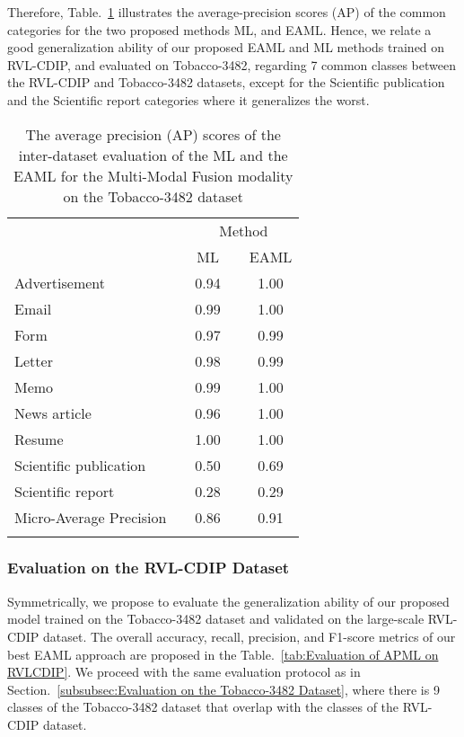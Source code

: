 \documentclass[twocolumn]{svjour3}
\begin{document}
Therefore, Table.~\ref{tab:AP scores} illustrates the average-precision scores (AP) of the common categories for the two proposed methods ML, and EAML. Hence, we relate a good generalization ability of our proposed EAML and ML methods trained on RVL-CDIP, and evaluated on Tobacco-3482, regarding 7 common classes between the RVL-CDIP and Tobacco-3482 datasets, except for the Scientific publication and the Scientific report categories where it generalizes the worst. 
\setlength\tabcolsep{0.6 pt}
\begin{table}[tbh]
\small
\centering
\caption{The average precision (AP) scores of the inter-dataset evaluation of the ML and the EAML for the Multi-Modal Fusion modality on the Tobacco-3482 dataset}
    \begin{tabular}{lcccc}
    \hline\noalign{\smallskip}
    \multicolumn{1}{c}{} && \multicolumn{3}{c}{Method} \\
         \noalign{\smallskip}\hline\noalign{\smallskip}
     \multicolumn{1}{c}{Class Labels} && \multicolumn{1}{c}{ML} && \multicolumn{1}{c}{EAML} \\
         \noalign{\smallskip}\hline\noalign{\smallskip}
         Advertisement && 0.94 && 1.00\\
         Email && 0.99 && 1.00\\
         Form && 0.97 && 0.99\\
         Letter && 0.98 && 0.99\\
         Memo && 0.99 && 1.00\\
         News article && 0.96 && 1.00\\
         Resume && 1.00 && 1.00\\
         Scientific publication && 0.50 && 0.69\\
         Scientific report && 0.28 && 0.29\\
    \noalign{\smallskip}\hline\noalign{\smallskip}
        Micro-Average Precision && 0.86 && 0.91 \\
    \noalign{\smallskip}\hline
    
    \end{tabular}\label{tab:AP scores}
    
\end{table}
\subsubsection{Evaluation on the RVL-CDIP Dataset}

Symmetrically, we propose to evaluate the generalization ability of our proposed model trained on the Tobacco-3482 dataset and validated on the large-scale RVL-CDIP dataset. The overall accuracy, recall, precision, and F1-score metrics of our best EAML approach are proposed in the Table.~\ref{tab:Evaluation of APML on RVLCDIP}.        
We proceed with the same evaluation protocol as in Section.~\ref{subsubsec:Evaluation on the Tobacco-3482 Dataset}, where there is 9 classes of the Tobacco-3482 dataset that overlap with the classes of the RVL-CDIP dataset.
\end{document}

